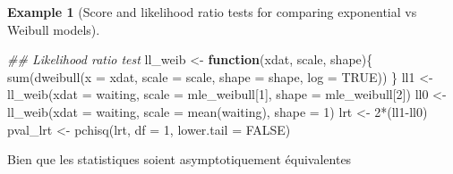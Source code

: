 \documentclass[
  11pt,
  letterpaper,
]{scrbook}
\newenvironment{Shaded}{\begin{snugshade}}{\end{snugshade}}
\newcommand{\AttributeTok}[1]{\textcolor[rgb]{0.40,0.45,0.13}{#1}}
\newcommand{\ConstantTok}[1]{\textcolor[rgb]{0.56,0.35,0.01}{#1}}
\newcommand{\ControlFlowTok}[1]{\textcolor[rgb]{0.00,0.23,0.31}{\textbf{#1}}}
\newcommand{\DecValTok}[1]{\textcolor[rgb]{0.68,0.00,0.00}{#1}}
\newcommand{\DocumentationTok}[1]{\textcolor[rgb]{0.37,0.37,0.37}{\textit{#1}}}
\newcommand{\FunctionTok}[1]{\textcolor[rgb]{0.28,0.35,0.67}{#1}}
\newcommand{\NormalTok}[1]{\textcolor[rgb]{0.00,0.23,0.31}{#1}}
\newcommand{\OtherTok}[1]{\textcolor[rgb]{0.00,0.23,0.31}{#1}}
\newcommand{\SpecialCharTok}[1]{\textcolor[rgb]{0.37,0.37,0.37}{#1}}
\theoremstyle{plain}
\theoremstyle{plain}
\theoremstyle{definition}
\newtheorem{example}{Example}[chapter]
\theoremstyle{definition}
\theoremstyle{remark}
\begin{document}
\begin{example}[Score and likelihood ratio tests for comparing
exponential vs Weibull
models]
\begin{Shaded}
\begin{Highlighting}[]
\DocumentationTok{\#\# Likelihood ratio test}
\NormalTok{ll\_weib }\OtherTok{\textless{}{-}} \ControlFlowTok{function}\NormalTok{(xdat, scale, shape)\{}
  \FunctionTok{sum}\NormalTok{(}\FunctionTok{dweibull}\NormalTok{(}\AttributeTok{x =}\NormalTok{ xdat, }\AttributeTok{scale =}\NormalTok{ scale, }\AttributeTok{shape =}\NormalTok{ shape, }\AttributeTok{log =} \ConstantTok{TRUE}\NormalTok{))}
\NormalTok{\}}
\NormalTok{ll1 }\OtherTok{\textless{}{-}} \FunctionTok{ll\_weib}\NormalTok{(}\AttributeTok{xdat =}\NormalTok{ waiting, }\AttributeTok{scale =}\NormalTok{ mle\_weibull[}\DecValTok{1}\NormalTok{], }\AttributeTok{shape =}\NormalTok{ mle\_weibull[}\DecValTok{2}\NormalTok{])}
\NormalTok{ll0 }\OtherTok{\textless{}{-}} \FunctionTok{ll\_weib}\NormalTok{(}\AttributeTok{xdat =}\NormalTok{ waiting, }\AttributeTok{scale =} \FunctionTok{mean}\NormalTok{(waiting), }\AttributeTok{shape =} \DecValTok{1}\NormalTok{)}
\NormalTok{lrt }\OtherTok{\textless{}{-}} \DecValTok{2}\SpecialCharTok{*}\NormalTok{(ll1}\SpecialCharTok{{-}}\NormalTok{ll0)}
\NormalTok{pval\_lrt }\OtherTok{\textless{}{-}} \FunctionTok{pchisq}\NormalTok{(lrt, }\AttributeTok{df =} \DecValTok{1}\NormalTok{, }\AttributeTok{lower.tail =} \ConstantTok{FALSE}\NormalTok{)}
\end{Highlighting}
\end{Shaded}

Bien que les statistiques soient asymptotiquement équivalentes

\end{example}
\end{document}
